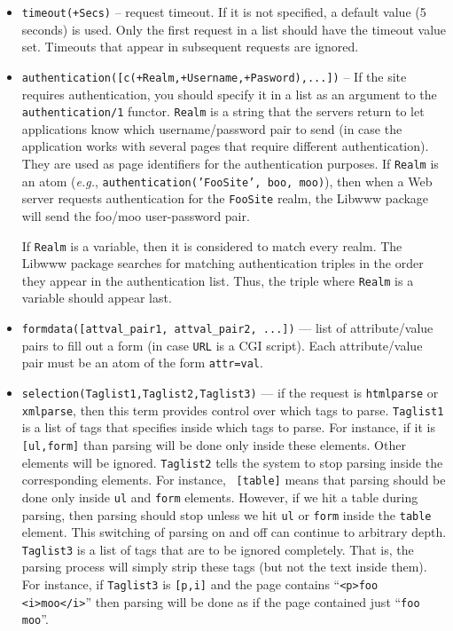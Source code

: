 \begin{itemize}
  \item {\tt timeout(+Secs)} -- request timeout. If it is not specified, a
    default value (5 seconds) is used. Only the first request in a list
    should have the timeout value set. Timeouts that appear in subsequent
    requests are ignored.
  \item {\tt authentication([c(+Realm,+Username,+Pasword),...])} -- If the
    site requires authentication, you should specify it in a list as an
    argument to the {\tt authentication/1} functor. {\tt Realm} is a string
    that the servers return to let applications know which
    username/password pair to send (in case the application works with
    several pages that require different authentication). They are used as
    page identifiers for the authentication purposes. If {\tt Realm} is an
    atom ({\it e.g.}, {\tt authentication('FooSite', boo, moo)}), then when
    a Web server requests authentication for the {\tt FooSite} realm, the
    Libwww package will send the foo/moo user-password pair.

    If {\tt Realm} is a variable, then it is considered to match every
    realm. The Libwww package searches for matching authentication triples
    in the order they appear in the authentication list. Thus, the triple
    where {\tt Realm} is a variable should appear last.
  \item {\tt formdata([attval\_pair1, attval\_pair2, ...])} --- list of
    attribute/value pairs to fill out a form (in case {\tt URL} is a CGI
    script). Each attribute/value pair must be an atom of the form
    {\tt attr=val}.
  \item {\tt selection(Taglist1,Taglist2,Taglist3)} --- if the request is
    {\tt htmlparse} or {\tt xmlparse}, then this term provides control over
    which tags to parse. {\tt Taglist1} is a list of tags that specifies
    inside which tags to parse. For instance, if it is {\tt [ul,form]}
    than parsing will be done only inside these elements. Other
    elements will be ignored. {\tt Taglist2} tells the system to stop
    parsing inside the corresponding elements. For instance, {\tt
      [table]} means that parsing should be done only inside {\tt ul} and
    {\tt form} elements. However, if we hit a table during parsing,
    then parsing should stop unless we hit {\tt ul} or {\tt form} inside
    the {\tt table} element. This switching of parsing on and off can
    continue to arbitrary depth. {\tt Taglist3} is a list of tags that are
    to be ignored completely. That is, the parsing process will simply
    strip these tags (but not the text inside them). For instance, if
    {\tt Taglist3} is {\tt [p,i]} and the page contains ``{\tt <p>foo
    <i>moo</i>}'' then parsing will be done as if the page contained just
  ``{\tt foo moo}''.
\end{itemize}
